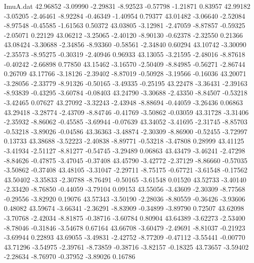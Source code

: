 \begin{filecontents}{ImuA.dat}
  42.96852   -3.09990   -2.29831   -8.92523   -0.57798   -1.21871    0.83957
  42.99182   -3.05205   -2.46461   -8.92284   -0.46349   -1.40954    0.79377
  43.01482   -3.06640   -2.52084   -8.97548   -0.45585   -1.61563    0.50372
  43.03805   -3.12981   -2.47059   -8.87857   -0.59325   -2.05071    0.22129
  43.06212   -3.25065   -2.40120   -8.90130   -0.62378   -2.32550    0.21366
  43.08424   -3.30688   -2.34856   -8.93360   -0.58561   -2.34840    0.60294
  43.10742   -3.30090   -2.35573   -8.95275   -0.30319   -2.40946    0.96933
  43.13055   -3.21595   -2.48016   -8.87618   -0.40242   -2.66898    0.77850
  43.15462   -3.16570   -2.50409   -8.84985   -0.56271   -2.86744    0.26709
  43.17766   -3.18126   -2.39402   -8.87019   -0.50928   -3.19566   -0.16036
  43.20071   -3.28056   -2.33779   -8.91326   -0.50165   -3.49335   -0.25195
  43.22478   -3.36431   -2.39163   -8.93839   -0.43295   -3.60784   -0.08403
  43.24790   -3.30688   -2.43350   -8.84507   -0.53218   -3.42465    0.07627
  43.27092   -3.32243   -2.43948   -8.88694   -0.44059   -3.26436    0.06863
  43.29418   -3.28774   -2.43709   -8.84746   -0.41769   -3.50862   -0.03059
  43.31728   -3.31406   -2.35932   -8.86062   -0.45585   -3.69944   -0.07639
  43.34052   -3.41695   -2.31745   -8.85703   -0.53218   -3.89026   -0.04586
  43.36363   -3.48874   -2.30309   -8.86900   -0.52455   -3.72997    0.13733
  43.38688   -3.52223   -2.40838   -8.89771   -0.53218   -3.47808    0.28999
  43.41125   -3.41934   -2.51127   -8.81277   -0.54745   -3.29489    0.06863
  43.43479   -3.46241   -2.47298   -8.84626   -0.47875   -3.47045   -0.37408
  43.45790   -3.42772   -2.37129   -8.86660   -0.57035   -3.50862   -0.37408
  43.48105   -3.31047   -2.29711   -8.75175   -0.67721   -3.61548   -0.17562
  43.50402   -3.35833   -2.30788   -8.76491   -0.50165   -3.61548    0.01520
  43.52733   -3.40140   -2.33420   -8.76850   -0.44059   -3.79104    0.09153
  43.55056   -3.43609   -2.30309   -8.77568   -0.29556   -3.82920    0.19076
  43.57343   -3.50190   -2.28036   -8.80559   -0.36426   -3.93606    0.48082
  43.59674   -3.66341   -2.36291   -8.83909   -0.34899   -3.89790    0.72507
  43.62098   -3.70768   -2.42034   -8.81875   -0.38716   -3.60784    0.80904
  43.64389   -3.62273   -2.53400   -8.78046   -0.31846   -3.54678    0.67164
  43.66708   -3.60479   -2.49691   -8.81037   -0.21923   -3.69944    0.22893
  43.69055   -3.49831   -2.42752   -8.77209   -0.47112   -3.55441   -0.00770
  43.71296   -3.54975   -2.39761   -8.73859   -0.38716   -3.82157   -0.18325
  43.73657   -3.59402   -2.28634   -8.76970   -0.37952   -3.89026    0.16786

\end{filecontents}

